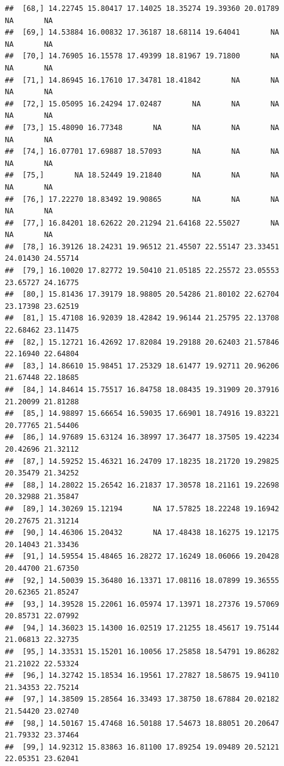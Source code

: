 \documentclass{article}\usepackage[]{graphicx}\usepackage[]{color}
\makeatletter
\newenvironment{kframe}{%
 \def\at@end@of@kframe{}%
 \ifinner\ifhmode%
  \def\at@end@of@kframe{\end{minipage}}%
  \begin{minipage}{\columnwidth}%
 \fi\fi%
 \def\FrameCommand##1{\hskip\@totalleftmargin \hskip-\fboxsep
 \colorbox{shadecolor}{##1}\hskip-\fboxsep
     \hskip-\linewidth \hskip-\@totalleftmargin \hskip\columnwidth}%
 \MakeFramed {\advance\hsize-\width
   \@totalleftmargin\z@ \linewidth\hsize
   \@setminipage}}%
 {\par\unskip\endMakeFramed%
 \at@end@of@kframe}
\newenvironment{knitrout}{}{} %
\makeatother
\begin{document}
\begin{knitrout}
\begin{kframe}
\begin{verbatim}
##  [68,] 14.22745 15.80417 17.14025 18.35274 19.39360 20.01789       NA       NA
##  [69,] 14.53884 16.00832 17.36187 18.68114 19.64041       NA       NA       NA
##  [70,] 14.76905 16.15578 17.49399 18.81967 19.71800       NA       NA       NA
##  [71,] 14.86945 16.17610 17.34781 18.41842       NA       NA       NA       NA
##  [72,] 15.05095 16.24294 17.02487       NA       NA       NA       NA       NA
##  [73,] 15.48090 16.77348       NA       NA       NA       NA       NA       NA
##  [74,] 16.07701 17.69887 18.57093       NA       NA       NA       NA       NA
##  [75,]       NA 18.52449 19.21840       NA       NA       NA       NA       NA
##  [76,] 17.22270 18.83492 19.90865       NA       NA       NA       NA       NA
##  [77,] 16.84201 18.62622 20.21294 21.64168 22.55027       NA       NA       NA
##  [78,] 16.39126 18.24231 19.96512 21.45507 22.55147 23.33451 24.01430 24.55714
##  [79,] 16.10020 17.82772 19.50410 21.05185 22.25572 23.05553 23.65727 24.16775
##  [80,] 15.81436 17.39179 18.98805 20.54286 21.80102 22.62704 23.17398 23.62519
##  [81,] 15.47108 16.92039 18.42842 19.96144 21.25795 22.13708 22.68462 23.11475
##  [82,] 15.12721 16.42692 17.82084 19.29188 20.62403 21.57846 22.16940 22.64804
##  [83,] 14.86610 15.98451 17.25329 18.61477 19.92711 20.96206 21.67448 22.18685
##  [84,] 14.84614 15.75517 16.84758 18.08435 19.31909 20.37916 21.20099 21.81288
##  [85,] 14.98897 15.66654 16.59035 17.66901 18.74916 19.83221 20.77765 21.54406
##  [86,] 14.97689 15.63124 16.38997 17.36477 18.37505 19.42234 20.42696 21.32112
##  [87,] 14.59252 15.46321 16.24709 17.18235 18.21720 19.29825 20.35479 21.34252
##  [88,] 14.28022 15.26542 16.21837 17.30578 18.21161 19.22698 20.32988 21.35847
##  [89,] 14.30269 15.12194       NA 17.57825 18.22248 19.16942 20.27675 21.31214
##  [90,] 14.46306 15.20432       NA 17.48438 18.16275 19.12175 20.14043 21.33436
##  [91,] 14.59554 15.48465 16.28272 17.16249 18.06066 19.20428 20.44700 21.67350
##  [92,] 14.50039 15.36480 16.13371 17.08116 18.07899 19.36555 20.62365 21.85247
##  [93,] 14.39528 15.22061 16.05974 17.13971 18.27376 19.57069 20.85731 22.07992
##  [94,] 14.36023 15.14300 16.02519 17.21255 18.45617 19.75144 21.06813 22.32735
##  [95,] 14.33531 15.15201 16.10056 17.25858 18.54791 19.86282 21.21022 22.53324
##  [96,] 14.32742 15.18534 16.19561 17.27827 18.58675 19.94110 21.34353 22.75214
##  [97,] 14.38509 15.28564 16.33493 17.38750 18.67884 20.02182 21.54420 23.02740
##  [98,] 14.50167 15.47468 16.50188 17.54673 18.88051 20.20647 21.79332 23.37464
##  [99,] 14.92312 15.83863 16.81100 17.89254 19.09489 20.52121 22.05351 23.62041

\end{verbatim}
\end{kframe}
\end{knitrout}
\end{document}
